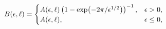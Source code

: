 \[B(\epsilon,\ell)=\begin{cases}A(\epsilon,\ell)\left(1-\mathop{\exp\/}\nolimits%
\!\left(-2\pi/\epsilon^{1/2}\right)\right)^{-1},&\epsilon>0,\\
A(\epsilon,\ell),&\epsilon\leq 0,\end{cases}\]